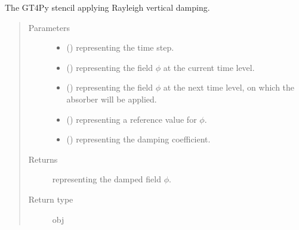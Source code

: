 \documentclass[letterpaper,10pt,english]{sphinxmanual}
\begin{document}
\begin{fulllineitems}
\begin{fulllineitems}
\begin{quote}
\begin{description}
\end{description}\end{quote}

\end{fulllineitems}


\begin{fulllineitems}
\label{\detokenize{api:dycore.vertical_damping.VerticalDampingRayleigh._stencil_defs}}
The GT4Py stencil applying Rayleigh vertical damping.
\begin{quote}\begin{description}
\item[{Parameters}] \leavevmode\begin{itemize}
\item {} 
 () \textendash{}  representing the time step.

\item {} 
 () \textendash{}  representing the field \(\phi\) at the current time level.

\item {} 
 () \textendash{}  representing the field \(\phi\) at the next time level, on
which the absorber will be applied.

\item {} 
 () \textendash{}  representing a reference value for \(\phi\).

\item {} 
 () \textendash{}  representing the damping coefficient.

\end{itemize}

\item[{Returns}] \leavevmode
{} representing the damped field \(\phi\).

\item[{Return type}] \leavevmode
obj


\end{description}
\end{quote}
\end{fulllineitems}
\end{fulllineitems}
\end{document}
